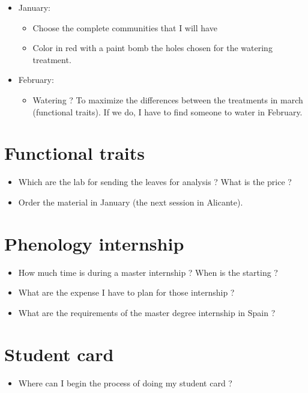 \documentclass[12pt]{article} %
\begin{document}
\begin{itemize}
	\item January:
		\begin{itemize}
			\item Choose the complete communities that I will have
			\item Color in red with a paint bomb the holes chosen for the watering treatment.
		\end{itemize}

	\item February:
		\begin{itemize}
			\item Watering ? To maximize the differences between the treatments in march (functional traits). If we do, I have to find someone to water in February.
		\end{itemize}
		
\end{itemize}

\section{Functional traits}
\label{sec:functional_traits}

\begin{itemize}
	\item Which are the lab for sending the leaves for analysis ? What is the price ?
	\item Order the material in January (the next session in Alicante).
\end{itemize}

\section{Phenology internship}
\label{sec:}

\begin{itemize}
	\item How much time is during a master internship ? When is the starting ?
	\item What are the expense I have to plan for those internship ?
	\item What are the requirements of the master degree internship in Spain ?
\end{itemize}



\section{Student card}
\label{sec:student_card}

\begin{itemize}
	\item Where can I begin the process of doing my student card ?
\end{itemize}
\end{document}
